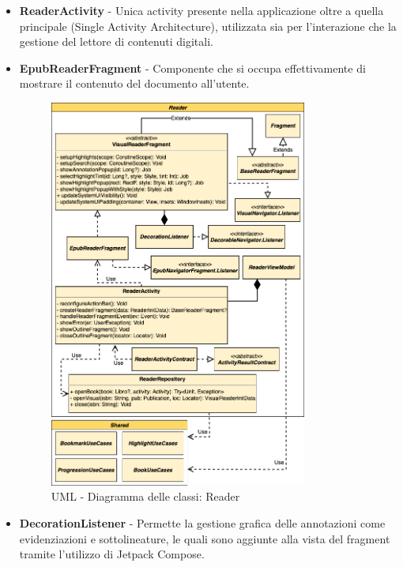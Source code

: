 \begin{itemize}
    \item \textbf{ReaderActivity} - Unica activity presente nella applicazione oltre a quella principale (Single Activity Architecture), utilizzata sia per l’interazione che la gestione del lettore di contenuti digitali.
    \item \textbf{EpubReaderFragment} - Componente che si occupa effettivamente di mostrare il contenuto del documento all'utente.

    \begin{figure}[H]
        \centering
        \includegraphics[width=0.8\textwidth]{img/reader-uml.png}
        \caption{UML - Diagramma delle classi: Reader}
        \label{reader-uml}
    \end{figure}
    
    \item \textbf{DecorationListener} - Permette la gestione grafica delle annotazioni come evidenziazioni e sottolineature, le quali sono aggiunte alla vista del fragment tramite l'utilizzo di Jetpack Compose.
\end{itemize}

